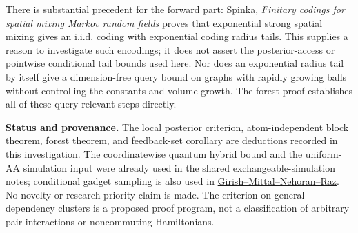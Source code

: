 There is substantial precedent for the forward part:
\href{https://arxiv.org/abs/1803.10578}{Spinka, \emph{Finitary codings
for spatial mixing Markov random fields}} proves that exponential
strong spatial mixing gives an i.i.d. coding with exponential coding
radius tails. This supplies a reason to investigate such encodings;
it does not assert the posterior-access or pointwise conditional
tail bounds used here. Nor does an exponential radius tail by itself
give a dimension-free query bound on graphs with rapidly growing
balls without controlling the constants and volume growth. The
forest proof establishes all of these query-relevant steps directly.

\textbf{Status and provenance.} The local posterior criterion,
atom-independent block theorem, forest theorem, and feedback-set
corollary are deductions recorded in this investigation. The
coordinatewise quantum hybrid bound and the uniform-AA simulation
input were already used in the shared exchangeable-simulation notes;
conditional gadget sampling is also used in
\href{https://arxiv.org/abs/2609.35327}{Girish--Mittal--Nehoran--Raz}.
No novelty or research-priority claim is made. The criterion on general
dependency clusters is a proposed proof program, not a classification
of arbitrary pair interactions or noncommuting Hamiltonians.

